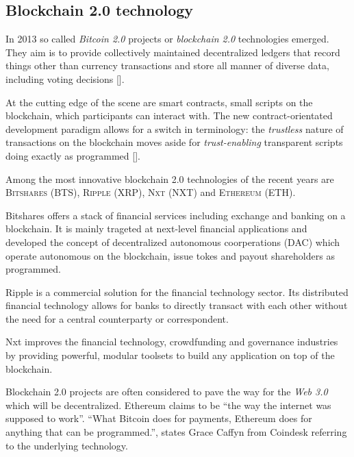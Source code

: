 \subsection{Blockchain 2.0 technology}
In 2013 so called \textit{Bitcoin 2.0} projects or \textit{blockchain 2.0} technologies emerged. They aim is to provide collectively maintained decentralized ledgers that record things other than currency transactions and store all manner of diverse data, including voting decisions [\cite{SCOTT2016}].\par
At the cutting edge of the scene are smart contracts, small scripts on the blockchain, which participants can interact with. The new contract-orientated development paradigm allows for a switch in terminology: the \textit{trustless} nature of transactions on the blockchain moves aside for \textit{trust-enabling} transparent scripts doing exactly as programmed [\cite{SCOTT2016}].\par
Among the most innovative blockchain 2.0 technologies of the recent years are \textsc{Bitshares (BTS)}, \textsc{Ripple (XRP)}, \textsc{Nxt (NXT)} and \textsc{Ethereum (ETH)}.\par %
Bitshares offers a stack of financial services including exchange and banking on a blockchain. It is mainly trageted at next-level financial applications and developed the concept of decentralized autonomous coorperations (\textsc{DAC}) which operate autonomous on the blockchain, issue tokes and payout shareholders as programmed.\par
Ripple is a commercial solution for the financial technology sector. Its distributed financial technology allows for banks to directly transact with each other without the need for a central counterparty or correspondent.\par
Nxt improves the financial technology, crowdfunding and governance industries by providing powerful, modular toolsets to build any application on top of the blockchain.\par
Blockchain 2.0 projects are often considered to pave the way for the \textit{Web 3.0} which will be decentralized. Ethereum claims to be \enquote{the way the internet was supposed to work}. \enquote{What Bitcoin does for payments, Ethereum does for anything that can be programmed.}, states Grace Caffyn from Coindesk referring to the underlying technology.\par
